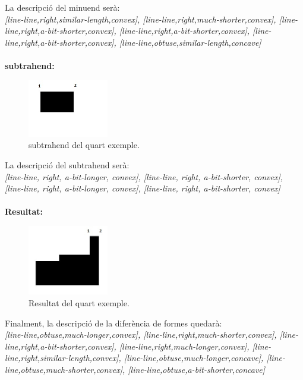 \documentclass{article}
\begin{document}
La descripció del minuend serà:
\\
\emph {[line-line,right,similar-length,convex], [line-line,right,much-shorter,convex], [line-line,right,a-bit-shorter,convex], [line-line,right,a-bit-shorter,convex], [line-line,right,a-bit-shorter,convex], [line-line,obtuse,similar-length,concave]}
\\
\\

{\bf subtrahend:}
\begin{figure}[!h]
\centering
\includegraphics[width=100pt]{images/quad_menut.jpg}
\caption {subtrahend del quart exemple.}
\label {fig:quad_punta}
\end{figure}

La descripció del subtrahend serà:
\\
\emph {[line-line, right, a-bit-longer, convex], [line-line, right, a-bit-shorter, convex], [line-line, right, a-bit-longer, convex], [line-line, right, a-bit-shorter, convex]}
\\
\\
{\bf Resultat:}
\begin{figure}[!h]
\centering
\includegraphics[width=100pt]{images/res4.jpg}
\caption {Resultat del quart exemple.}
\label {fig:res4}
\end{figure}

Finalment, la descripció de la diferència de formes quedarà:
\\
\emph {[line-line,obtuse,much-longer,convex], [line-line,right,much-shorter,convex], [line-line,right,a-bit-shorter,convex], [line-line,right,much-longer,convex], [line-line,right,similar-length,convex], [line-line,obtuse,much-longer,concave], [line-line,obtuse,much-shorter,convex], [line-line,obtuse,a-bit-shorter,concave]}
\\
\\
\end{document}
